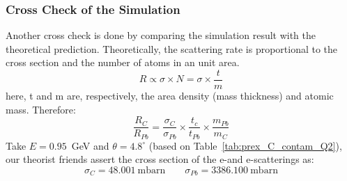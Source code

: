 \subsubsection{Cross Check of the Simulation}
Another cross check is done by comparing the simulation result with the 
theoretical prediction. Theoretically,
the scattering rate is proportional to the cross section and the number of atoms
in an unit area. 
\begin{equation}
    R \propto \sigma \times N = \sigma \times \frac{t}{m}
\end{equation}
here, t and m are, respectively, the area density (mass thickness) and atomic mass. 
Therefore:
\begin{equation}
    \frac{R_C}{R_{Pb}} = \frac{\sigma_C}{\sigma_{Pb}} \times \frac{t_c}{t_{Pb}} \times \frac{m_{Pb}}{m_C}
\end{equation}
Take $E = 0.95$~GeV and $\theta = 4.8^\circ$ (based on Table~\ref{tab:prex_C_contam_Q2}), 
our theorist friends assert the cross section of the e-\C and e-\Pb scatterings
as:
\begin{equation*}
    \sigma_C = 48.001\ \mathrm{mbarn}	\qquad \sigma_{Pb} = 3386.100\ \mathrm{mbarn}	
\end{equation*}


